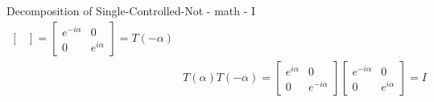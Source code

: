 \documentclass{beamer}
\begin{document}
\begin{frame}{Decomposition of Single-Controlled-Not - math - I}
{\begin{align*}
\begin{bmatrix}
      \end{bmatrix} 
      =
      \begin{bmatrix} 
        e^{- i\alpha} & 0 \\
        0 & e^{i\alpha}
      \end{bmatrix} 
      =
      T(-\alpha)
      \\
      & T(\alpha) T(-\alpha) = 
      \begin{bmatrix} 
        e^{i\alpha} & 0 \\
        0 & e^{-i\alpha}
      \end{bmatrix} 
      \begin{bmatrix} 
        e^{- i\alpha} & 0 \\
        0 & e^{i\alpha}
      \end{bmatrix} 
      = I
    \end{align*}
  }%
\end{frame}
\end{document}
